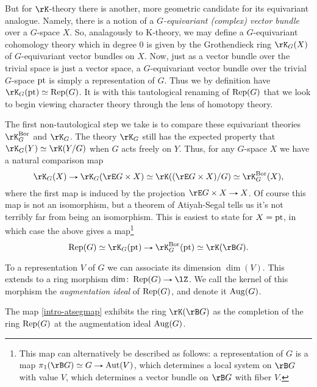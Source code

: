 But for $\rK$-theory there is another, more geometric candidate for
its equivariant analogue. Namely, there is a notion of a
\emph{$G$-equivariant (complex) vector bundle} over a $G$-space
$X$. So, analagously to K-theory, we may define a $G$-equivariant
cohomology theory which in degree $0$ is given by the Grothendieck
ring $\rK_G(X)$ of $G$-equivariant vector bundles on $X$. Now, just as
a vector bundle over the trivial space is just a vector space, a
$G$-equivariant vector bundle over the trivial $G$-space $\mathrm{pt}$ is
simply a representation of $G$. Thus we by definition have
$\rK_G(\pt) \iso \Rep(G)$. It is with this tautological renaming of
$\operatorname{Rep}(G)$ that we look to begin viewing character theory through the
lens of homotopy theory.

The first non-tautological step we take is to compare these
equivariant theories $\rK^\Bor_G$ and $\rK_G$. The theory $\rK_G$
still has the expected property that $\rK_G(Y) \iso \rK(Y/G)$ when $G$
acts freely on $Y$. Thus, for any $G$-space $X$ we have a natural
comparison map
\[
\rK_G(X) \to
\rK_G(\rE G \times X) \iso
\rK((\rE G \times X)/G) \iso
\rK^\Bor_G(X),
\]
where the first map is induced by the projection
$\rE G \times X \to X$. Of course this map is not an isomorphism, but
a theorem of Atiyah-Segal tells us it's not terribly far from being an
isomorphism. This is easiest to state for $X = \mathrm{pt}$, in which case the
above gives a map\footnote{This map can alternatively be described as
  follows: a representation of $G$ is a map
  $\pi_1(\rB G) \iso G \to \Aut(V)$, which determines a local system
  on $\rB G$ with value $V$, which determines a vector bundle on
  $\rB G$ with fiber $V$.}
\begin{equation}
  \label{intro-atsegmap}
  \Rep(G) \iso \rK_G(\pt) \to \rK^\Bor_G(\pt) \iso \rK(\rB G).
\end{equation}

\begin{definition}
  \label{intro-aug}
  To a representation $V$ of $G$ we can associate its dimension
  $\dim(V)$. This extends to a ring morphism
  $\dim \c \Rep(G) \to \lZ$. We call the kernel of this morphism the
  \emph{augmentation ideal} of $\operatorname{Rep}(G)$, and denote it $\operatorname{Aug}(G)$.
\end{definition}

\begin{theorem}
  \label{intro-atseg}
  The map \cref{intro-atsegmap} exhibits the ring $\rK(\rB G)$ as the
  completion of the ring $\operatorname{Rep}(G)$ at the augmentation ideal
  $\operatorname{Aug}(G)$.
\end{theorem}

